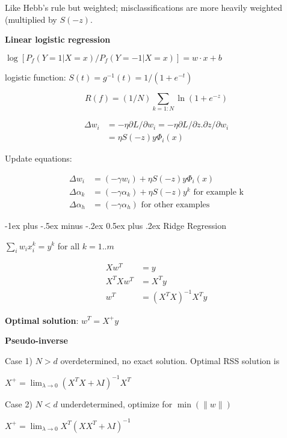 \documentclass[10pt,landscape]{article}
\makeatletter
\renewcommand{\section}{\@startsection{section}{1}{0mm}%
                                {-1ex plus -.5ex minus -.2ex}%
                                {0.5ex plus .2ex}%
                                {\normalfont\large\bfseries}}
\makeatother
\begin{document}
\begin{multicols}{3}
Like Hebb's rule but weighted; misclassifications are more heavily weighted (multiplied by $S(-z)$.

\textbf{Linear logistic regression}

$\log [P_f (Y=1 | X=x) / P_f (Y=-1 | X=x)] = w \cdot x + b$

logistic function: $S(t) = g^{-1}(t) = 1 / (1+e^{-t})$

\begin{equation}
R(f) = (1/N) \sum_{k=1:N} \ln(1+e^{-z})
\end{equation}

\begin{align*}
\Delta w_i &= -\eta \partial L  / \partial w_i = -\eta \partial L / \partial z . \partial z / \partial w_i \\
&= \eta S(-z) y \Phi_i (x)
\end{align*}

Update equations:

\begin{align*}
\Delta w_i &= (-\gamma w_i) + \eta S(-z) y \Phi_i (x) \\
\Delta \alpha_k &= (-\gamma \alpha_k) + \eta S(-z) y^k \text{ for example k} \\
\Delta \alpha_h &= (-\gamma \alpha_h) \text{ for other examples}
\end{align*}


\section{Ridge Regression}

$\sum_i w_i x^k_i = y^k$ for all $k=1..m$

\begin{align*}
Xw^T &= y \\
X^T X w^T &= X^T y \\
w^T &= (X^T X)^{-1} X^T y
\end{align*}

\textbf{Optimal solution}: $w^T = X^+ y$

\textbf{Pseudo-inverse}

Case 1) $N > d$ overdetermined, no exact solution. Optimal RSS solution is

$X^+ = \lim_{\lambda \rightarrow 0} (X^T X + \lambda I)^{-1} X^T$

Case 2) $N < d$ underdetermined, optimize for $\min(\lVert w \rVert)$

$X^+ = \lim_{\lambda \rightarrow 0} X^T(XX^T + \lambda I)^{-1}$


\end{multicols}
\end{document}
